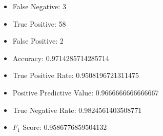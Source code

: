 \documentclass[12pt]{article}
\begin{document}
\begin{enumerate}
\begin{itemize}
        	\item False Negative: 3
        	\item True Positive: 58
        	\item False Positive: 2
        	\item Accuracy: 0.9714285714285714
        	\item True Positive Rate: 0.9508196721311475
        	\item Positive Predictive Value: 0.9666666666666667
        	\item True Negative Rate: 0.9824561403508771
        	\item $F_1$ Score: 0.9586776859504132
        \end{itemize}
    \end{enumerate}
	
\end{document}
